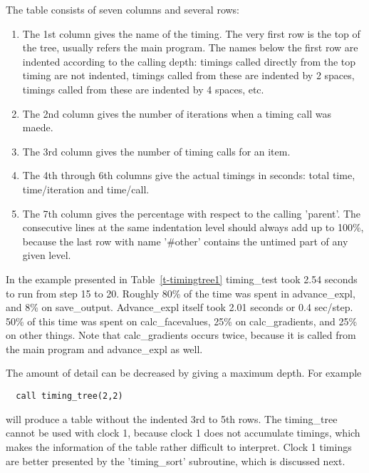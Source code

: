 \documentclass[10pt]{article}
\begin{document}
The table consists of seven columns and several rows:
\begin{enumerate}
\item 
The 1st column gives the name of the timing. 
    The very first row is the top of the tree, usually refers the main program.
    The names below the first row are indented according to the calling depth:
    timings called directly from the top timing are not indented, 
    timings called from these are indented by 2 spaces, 
    timings called from these are indented by 4 spaces, etc.
\item
The 2nd column gives the number of iterations when a timing call was maede.
\item
The 3rd column gives the number of timing calls for an item.
\item
The 4th through 6th columns give the actual timings in seconds: 
    total time, time/iteration and time/call.
\item
The 7th column gives the percentage with respect to the 
    calling 'parent'. The consecutive lines at the
    same indentation level should always add up to 100\%, because
    the last row with name '\#other' contains the untimed part of any 
    given level.
\end{enumerate}

In the example presented in Table~\ref{t-timingtree1} 
timing\_test took 2.54 seconds to run from step 15 to 20. 
Roughly 80\% of the time was spent in advance\_expl, and 8\% on save\_output.
Advance\_expl itself took 2.01 seconds or 0.4 sec/step. 50\% of this time
was spent on calc\_facevalues, 25\% on calc\_gradients, and 25\% on 
other things.
Note that calc\_gradients occurs twice, because it is called from
the main program and advance\_expl as well. 

The amount of detail can be decreased by giving a maximum depth. For example
\begin{verbatim}
  call timing_tree(2,2)
\end{verbatim}
will produce a table without the indented 3rd to 5th rows. 
The timing\_tree cannot be used with clock 1, because clock 1 does
not accumulate timings, which makes the information of the table
rather difficult to interpret. Clock 1 timings are better presented
by the 'timing\_sort' subroutine, which is discussed next.
\end{document}
